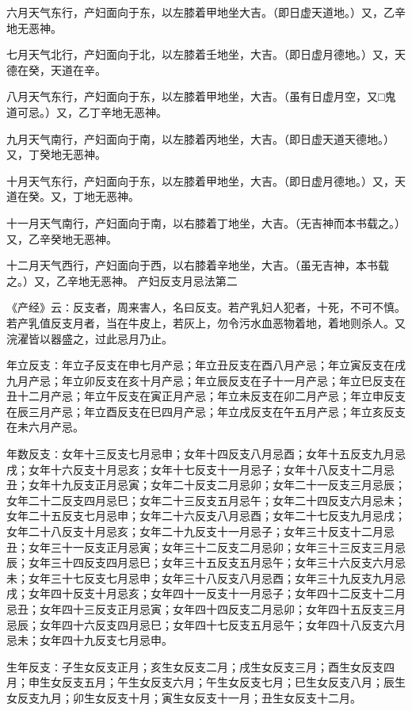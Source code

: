 \documentclass[a4paper,12pt,UTF8,twoside]{ctexbook}
\begin{document}
六月天气东行，产妇面向于东，以左膝着甲地坐大吉。（即日虚天道地。）又，乙辛地无恶神。

七月天气北行，产妇面向于北，以左膝着壬地坐，大吉。（即日虚月德地。）又，天德在癸，天道在辛。

八月天气东行，产妇面向于东，以左膝着甲地坐，大吉。（虽有日虚月空，又□鬼道可忌。）又，乙丁辛地无恶神。

九月天气南行，产妇面向于南，以左膝着丙地坐，大吉。（即日虚天道天德地。）又，丁癸地无恶神。

十月天气东行，产妇面向于东，以左膝着甲地坐，大吉。（即日虚月德地。）又，天道在癸。又，丁地无恶神。

十一月天气南行，产妇面向于南，以右膝着丁地坐，大吉。（无吉神而本书载之。）又，乙辛癸地无恶神。

十二月天气西行，产妇面向于西，以右膝着辛地坐，大吉。（虽无吉神，本书载之。）又，乙辛地无恶神。
产妇反支月忌法第二

《产经》云∶反支者，周来害人，名曰反支。若产乳妇人犯者，十死，不可不慎。若产乳值反支月者，当在牛皮上，若灰上，勿令污水血恶物着地，着地则杀人。又浣濯皆以器盛之，过此忌月乃止。

年立反支∶年立子反支在申七月产忌；年立丑反支在酉八月产忌；年立寅反支在戌九月产忌；年立卯反支在亥十月产忌；年立辰反支在子十一月产忌；年立巳反支在丑十二月产忌；年立午反支在寅正月产忌；年立未反支在卯二月产忌；年立申反支在辰三月产忌；年立酉反支在巳四月产忌；年立戌反支在午五月产忌；年立亥反支在未六月产忌。

年数反支∶女年十三反支七月忌申；女年十四反支八月忌酉；女年十五反支九月忌戌；女年十六反支十月忌亥；女年十七反支十一月忌子；女年十八反支十二月忌丑；女年十九反支正月忌寅；女年二十反支二月忌卯；女年二十一反支三月忌辰；女年二十二反支四月忌巳；女年二十三反支五月忌午；女年二十四反支六月忌未；女年二十五反支七月忌申；女年二十六反支八月忌酉；女年二十七反支九月忌戌；女年二十八反支十月忌亥；女年二十九反支十一月忌子；女年三十反支十二月忌丑；女年三十一反支正月忌寅；女年三十二反支二月忌卯；女年三十三反支三月忌辰；女年三十四反支四月忌巳；女年三十五反支五月忌午；女年三十六反支六月忌未；女年三十七反支七月忌申；女年三十八反支八月忌酉；女年三十九反支九月忌戌；女年四十反支十月忌亥；女年四十一反支十一月忌子；女年四十二反支十二月忌丑；女年四十三反支正月忌寅；女年四十四反支二月忌卯；女年四十五反支三月忌辰；女年四十六反支四月忌巳；女年四十七反支五月忌午；女年四十八反支六月忌未；女年四十九反支七月忌申。

生年反支∶子生女反支正月；亥生女反支二月；戌生女反支三月；酉生女反支四月；申生女反支五月；午生女反支六月；午生女反支七月；巳生女反支八月；辰生女反支九月；卯生女反支十月；寅生女反支十一月；丑生女反支十二月。
\end{document}
